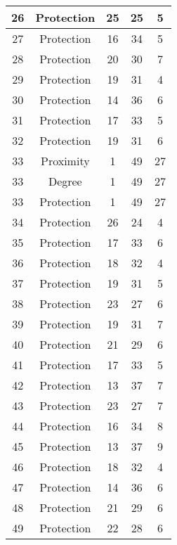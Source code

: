\documentclass[results.tex]{subfiles}
\begin{document}
\begin{center}
\begin{tabular}{| c || c | c | c | c |}
    \hline
    26 & Protection & 25 & 25 & 5 \\ 
    \hline
    27 & Protection & 16 & 34 & 5 \\ 
    \hline
    28 & Protection & 20 & 30 & 7 \\ 
    \hline
    29 & Protection & 19 & 31 & 4 \\ 
    \hline
    30 & Protection & 14 & 36 & 6 \\ 
    \hline
    31 & Protection & 17 & 33 & 5 \\ 
    \hline
    32 & Protection & 19 & 31 & 6 \\ 
    \hline
    33 & Proximity & 1 & 49 & 27 \\ 
    \hline
    33 & Degree & 1 & 49 & 27 \\ 
    \hline
    33 & Protection & 1 & 49 & 27 \\ 
    \hline
    34 & Protection & 26 & 24 & 4 \\ 
    \hline
    35 & Protection & 17 & 33 & 6 \\ 
    \hline
    36 & Protection & 18 & 32 & 4 \\ 
    \hline
    37 & Protection & 19 & 31 & 5 \\ 
    \hline
    38 & Protection & 23 & 27 & 6 \\ 
    \hline
    39 & Protection & 19 & 31 & 7 \\ 
    \hline
    40 & Protection & 21 & 29 & 6 \\ 
    \hline
    41 & Protection & 17 & 33 & 5 \\ 
    \hline
    42 & Protection & 13 & 37 & 7 \\ 
    \hline
    43 & Protection & 23 & 27 & 7 \\ 
    \hline
    44 & Protection & 16 & 34 & 8 \\ 
    \hline
    45 & Protection & 13 & 37 & 9 \\ 
    \hline
    46 & Protection & 18 & 32 & 4 \\ 
    \hline
    47 & Protection & 14 & 36 & 6 \\ 
    \hline
    48 & Protection & 21 & 29 & 6 \\ 
    \hline
    49 & Protection & 22 & 28 & 6 \\ 
    \hline   \end{tabular}
\end{center}
\end{document}
